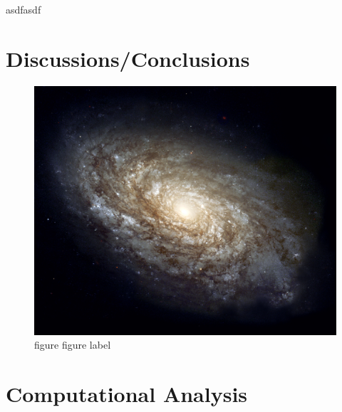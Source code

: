 \documentclass[11pt,twocolumn]{article}
\begin{document}
asdfasdf

\section{Discussions/Conclusions}
\lipsum[1-3]


\begin{figure}[htb]
    \centering 
    \includegraphics[width=\linewidth]{samplefig.jpg}
    \caption{\label{fig:galaxy}figure figure label}
\end{figure}

\lipsum[4-5]

\section{Computational Analysis}
\lipsum[1-5]
\end{document}

